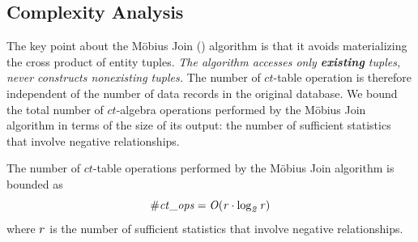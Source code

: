\documentclass{sig-alternate-2013}
\newcommand{\ct}{\mathit{ct}}
\begin{document}
\subsection{Complexity Analysis} 
\label{sec:complexity} 

The key point about the M\"obius Join (\MJ) algorithm %
is that it avoids materializing the cross product of entity tuples. {\em The algorithm accesses  only \textbf{existing} tuples, never constructs nonexisting tuples.} The number of $\ct$-table operation is therefore independent of the number of data records in the original database. We bound the total number of $\ct$-algebra operations performed by the M\"obius Join algorithm in terms of the size of its output: the number of sufficient statistics that involve negative relationships. 
%
\begin{proposition}
The number of $\ct$-table operations performed by the M\"obius Join algorithm is bounded as $$\it{\# \ct\_\it{ops}} = O(r \cdot \log_{2} r)$$ where $r$ is the number of sufficient statistics that involve negative relationships.
\end{proposition}
%
\end{document}

